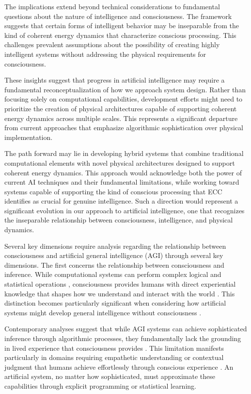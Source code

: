 The implications extend beyond technical considerations to fundamental questions about the nature of intelligence and consciousness. The framework suggests that certain forms of intelligent behavior may be inseparable from the kind of coherent energy dynamics that characterize conscious processing. This challenges prevalent assumptions about the possibility of creating highly intelligent systems without addressing the physical requirements for consciousness.

These insights suggest that progress in artificial intelligence may require a fundamental reconceptualization of how we approach system design. Rather than focusing solely on computational capabilities, development efforts might need to prioritize the creation of physical architectures capable of supporting coherent energy dynamics across multiple scales. This represents a significant departure from current approaches that emphasize algorithmic sophistication over physical implementation.

The path forward may lie in developing hybrid systems that combine traditional computational elements with novel physical architectures designed to support coherent energy dynamics. This approach would acknowledge both the power of current AI techniques and their fundamental limitations, while working toward systems capable of supporting the kind of conscious processing that ECC identifies as crucial for genuine intelligence. Such a direction would represent a significant evolution in our approach to artificial intelligence, one that recognizes the inseparable relationship between consciousness, intelligence, and physical dynamics.

Several key dimensions require analysis regarding the relationship between consciousness and artificial general intelligence (AGI) through several key dimensions. The first concerns the relationship between consciousness and inference. While computational systems can perform complex logical and statistical operations \cite{Pearl2018}, consciousness provides humans with direct experiential knowledge that shapes how we understand and interact with the world \cite{ORegan2011}. This distinction becomes particularly significant when considering how artificial systems might develop general intelligence without consciousness \cite{Marcus2019}.

Contemporary analyses suggest that while AGI systems can achieve sophisticated inference through algorithmic processes, they fundamentally lack the grounding in lived experience that consciousness provides \cite{Dreyfus1992}. This limitation manifests particularly in domains requiring empathetic understanding or contextual judgment that humans achieve effortlessly through conscious experience \cite{Lake2017}. An artificial system, no matter how sophisticated, must approximate these capabilities through explicit programming or statistical learning.

